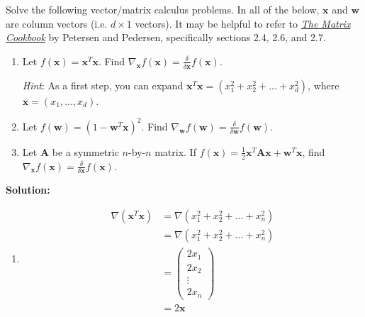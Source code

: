 \documentclass{harvardml}
\theoremstyle{definition}
\theoremstyle{plain}
\begin{document}
        
        

\begin{problem} 
		       Solve the following vector/matrix calculus problems. In all of the below, $\mathbf{x}$ and $\mathbf{w}$ are column vectors (i.e. $d \times 1$ vectors).  It may be helpful to refer to \href{https://www.math.uwaterloo.ca/~hwolkowi/matrixcookbook.pdf}{\emph{The Matrix Cookbook}} by Petersen and Pedersen, specifically sections 2.4, 2.6, and 2.7.
		    
		    \begin{enumerate} [label=(\alph*)]
		        \item Let $f(\mathbf{x}) = \mathbf{x}^T \mathbf{x}$. Find $\nabla_{\mathbf{x}} f(\mathbf{x}) = \frac{\delta}{\delta \mathbf{x}} f(\mathbf{x})$.
		        
		        \emph{Hint}: As a first step, you can expand $\mathbf{x}^T \mathbf{x} = (x_1^2 + x_2^2 + ... + x_d^2)$, where $\mathbf{x} = (x_1, ..., x_d)$. 
		        
		        \item Let $f(\mathbf{w}) = (1 - \mathbf{w}^T \mathbf{x})^2$. Find $\nabla_{\mathbf{w}} f(\mathbf{w}) = \frac{\delta}{\delta \mathbf{w}} f(\mathbf{w})$.
		        
		        \item Let $\mathbf{A}$ be a symmetric $n$-by-$n$ matrix. If $f(\mathbf{x}) = \frac{1}{2}\mathbf{x}^T \mathbf{A} \mathbf{x} + \mathbf{w}^T \mathbf{x}$, find $\nabla_{\mathbf{x}} f(\mathbf{x}) = \frac{\delta}{\delta \mathbf{x}} f(\mathbf{x})$.
		        \end{enumerate}
		    \textbf{Solution:}
		    
		    \begin{enumerate} [label=(\alph*)]
		        \item \begin{align*}
		            \nabla (\mathbf{x}^T\mathbf{x}) &= \nabla (x_{1}^2 + x_{2}^2 + \ldots + x_{n}^2) \\
		            &= \nabla (x_{1}^2 + x_{2}^2 + \ldots + x_{n}^2) \\
		            &= \begin{pmatrix} 2x_1 \\ 2x_2 \\ \vdots \\ 2x_n
		            \end{pmatrix} \\
		            &= 2\mathbf{x}
		        \end{align*}
		        

\end{enumerate}
\end{problem}
\end{document}

